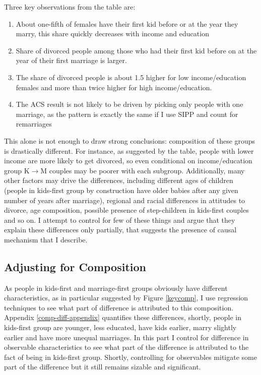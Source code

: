 \documentclass[12pt,letter]{article}
\begin{document}
Three key observations from the table are:
\begin{enumerate}
\item About one-fifth of females have their first kid before or at the year they marry, this share quickly decreases with income and education
\item Share of divorced people among those who had their first kid before on at the year of their first marriage is larger.
\item The share of divorced people is about 1.5 higher for low income/education females and more than twice higher for high income/education.
\item The ACS result is not likely to be driven by picking only people with one marriage, as the pattern is exactly the same if I use SIPP and count for remarriages
\end{enumerate}

This alone is not enough to draw strong conclusions: composition of these groups is drastically different. For instance, as suggested by the table, people with lower income are more likely to get divorced, so even conditional on income/education group K$\to$M couples may be poorer with each subgroup. Additionally, many other factors may drive the differences, including different ages of children (people in kids-first group by construction have older babies after any given number of years after marriage), regional and racial differences in attitudes to divorce, age composition, possible presence of step-children in kids-first couples and so on. I attempt to control for few of these things and argue that they explain these differences only partially, that suggests the presence of causal mechanism that I describe.

\subsection{Adjusting for Composition\label{adcomp}}
As people in kids-first and marriage-first groups obviously have different characteristics, as in particular suggested by Figure \ref{keycomp}, I use regression techniques to see what part of difference is attributed to this composition. Appendix \ref{comp-diff-appendix} quantifies these differences, shortly, people in kids-first group are younger, less educated, have kids earlier, marry slightly earlier and have more unequal marriages. In this part I control for difference in observable characteristics to see what part of the difference is attributed to the fact of being in kids-first group. Shortly, controlling for observables mitigate some part of the difference but it still remains sizable and significant.
\end{document}
